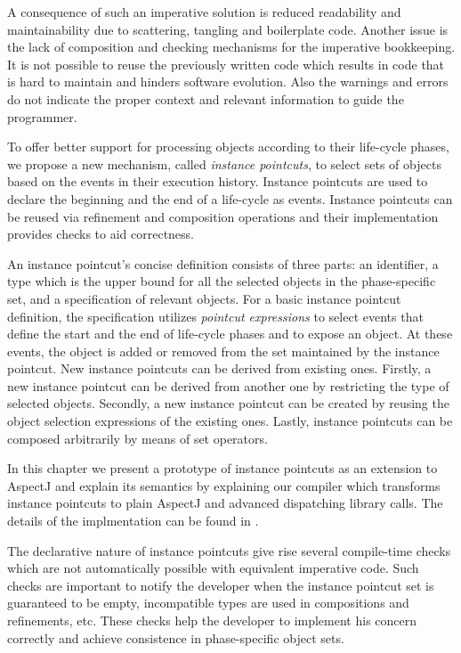 A consequence of such an imperative solution is reduced readability and maintainability due to scattering, tangling and boilerplate code. Another issue is the lack of composition and checking mechanisms for the imperative bookkeeping. It is not possible to reuse the previously written code which results in code that is hard to maintain and hinders software evolution. Also the warnings and errors do not indicate the proper context and relevant information to guide the programmer.


To offer better support for processing objects according to their life-cycle phases, we propose a new mechanism, called \emph{instance pointcuts}, to select sets of objects based on the events in their execution history.
Instance pointcuts are used to declare the beginning and the end of a life-cycle as events. Instance pointcuts can be reused via refinement and composition operations and their implementation provides checks to aid correctness. 

An instance pointcut's concise definition consists of three parts: an identifier, a type which is the upper bound for all the selected objects in the phase-specific set, and a specification of relevant objects.
For a basic instance pointcut definition, the specification utilizes \emph{pointcut expressions} to select events that define the start and the end of life-cycle phases and to expose an object. At these events, the object is added or removed from the set maintained by the instance pointcut. 
New instance pointcuts can be derived from existing ones. Firstly, a new instance pointcut can be derived from another one by restricting the type of selected objects. 
Secondly, a new instance pointcut can be created by reusing the object selection expressions of the existing ones.
Lastly, instance pointcuts can be composed arbitrarily by means of set operators. 

In this chapter we present a prototype of instance pointcuts as an extension to AspectJ \cite{kiczales2001overview} and explain its semantics by explaining our compiler which transforms instance pointcuts to plain AspectJ and advanced dispatching library calls. The details of the implmentation can be found in .

The declarative nature of instance pointcuts give rise several compile-time checks which are not automatically possible with equivalent imperative code. 
Such checks are important to notify the developer when the instance pointcut set is guaranteed to be empty, incompatible types are used  in compositions and refinements, etc.  These checks help the developer to implement his concern correctly and achieve consistence in phase-specific object sets. 


